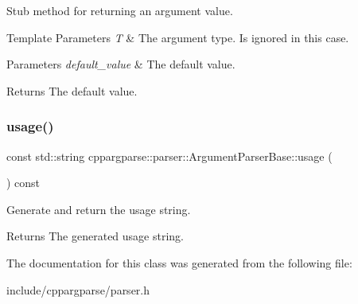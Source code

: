 Stub method for returning an argument value. 


\begin{DoxyTemplParams}{Template Parameters}
{\em T} & The argument type. Is ignored in this case.\\
\hline
\end{DoxyTemplParams}

\begin{DoxyParams}{Parameters}
{\em default\+\_\+value} & The default value.\\
\hline
\end{DoxyParams}
\begin{DoxyReturn}{Returns}
The default value. 
\end{DoxyReturn}
\mbox{\label{classcppargparse_1_1parser_1_1ArgumentParserBase_af99c2847a2cd19b1444dcb9ab2fb8103}} 
\subsubsection{\texorpdfstring{usage()}{usage()}}
{\footnotesize\ttfamily const std\+::string cppargparse\+::parser\+::\+Argument\+Parser\+Base\+::usage (\begin{DoxyParamCaption}{ }\end{DoxyParamCaption}) const\hspace{0.3cm}{\ttfamily [inline]}}



Generate and return the usage string. 

\begin{DoxyReturn}{Returns}
The generated usage string. 
\end{DoxyReturn}


The documentation for this class was generated from the following file\+:\begin{DoxyCompactItemize}
\item 
include/cppargparse/parser.\+h\end{DoxyCompactItemize}

